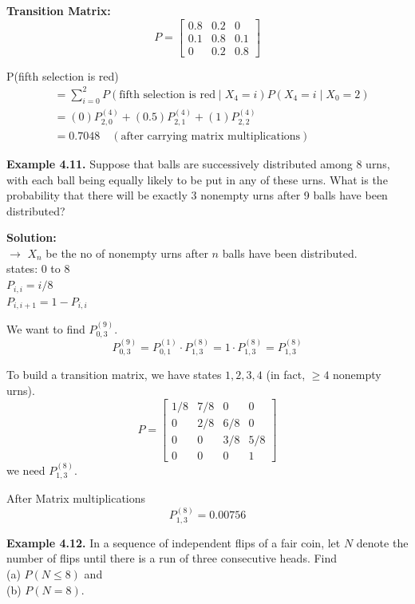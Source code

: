 \vspace{0.5cm}
\textbf{Transition Matrix:}
\[ P = \begin{bmatrix} 0.8 & 0.2 & 0 \\ 0.1 & 0.8 & 0.1 \\ 0 & 0.2 & 0.8 \end{bmatrix} \]

P(fifth selection is red)
\begin{align*}
    &= \sum_{i=0}^2 P(\text{fifth selection is red} \mid X_4 = i) P(X_4 = i \mid X_0 = 2) \\
    &= (0) P_{2,0}^{(4)} + (0.5) P_{2,1}^{(4)} + (1) P_{2,2}^{(4)} \\
    &= 0.7048 \quad (\text{after carrying matrix multiplications})
\end{align*}

\newpage

\textbf{Example 4.11.} Suppose that balls are successively distributed among 8 urns, with
each ball being equally likely to be put in any of these urns. What is the probability
that there will be exactly 3 nonempty urns after 9 balls have been distributed?

\textbf{Solution:} \\
$\rightarrow$ $X_n$ be the no of nonempty urns after $n$ balls have been distributed. \\
states: $0$ to $8$ \\
$P_{i,i} = i/8$ \\
$P_{i,i+1} = 1 - P_{i,i}$

We want to find $P_{0,3}^{(9)}$.
\[ P_{0,3}^{(9)} = P_{0,1}^{(1)} \cdot P_{1,3}^{(8)} = 1 \cdot P_{1,3}^{(8)} = P_{1,3}^{(8)} \]

To build a transition matrix, we have states $1, 2, 3, 4$ (in fact, $\geq 4$ nonempty urns).
\[ P = \begin{bmatrix} 1/8 & 7/8 & 0 & 0 \\ 0 & 2/8 & 6/8 & 0 \\ 0 & 0 & 3/8 & 5/8 \\ 0 & 0 & 0 & 1 \end{bmatrix} \]
we need $P_{1,3}^{(8)}$.

After Matrix multiplications
\[ P_{1,3}^{(8)} = 0.00756 \]

\vspace{3em}

\textbf{Example 4.12.} In a sequence of independent flips of a fair coin, let $N$ denote the number of flips until there is a run of three consecutive heads. Find \\
(a) $P(N \leq 8)$ and \\
(b) $P(N = 8)$.

